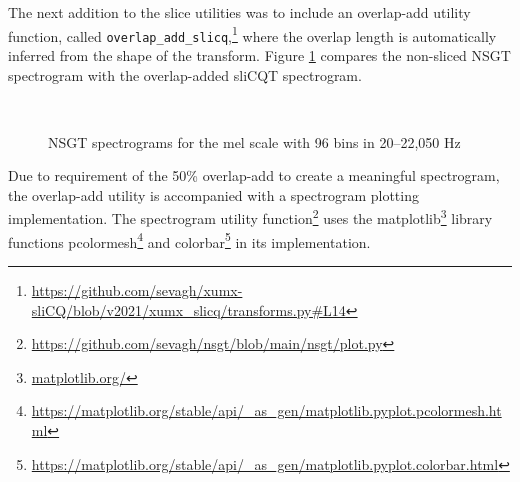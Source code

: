 \documentclass[report.tex]{subfiles}
\begin{document}
The next addition to the slice utilities was to include an overlap-add utility function, called \Verb#overlap_add_slicq#,\footnote{\url{https://github.com/sevagh/xumx-sliCQ/blob/v2021/xumx_slicq/transforms.py\#L14}} where the overlap length is automatically inferred from the shape of the transform. Figure \ref{fig:overlappedspectrograms} compares the non-sliced NSGT spectrogram with the overlap-added sliCQT spectrogram.

\begin{figure}[ht]
	\centering
	\\
	\caption{NSGT spectrograms for the mel scale with 96 bins in 20--22,050 Hz}
	\label{fig:overlappedspectrograms}
\end{figure}

Due to requirement of the 50\% overlap-add to create a meaningful spectrogram, the overlap-add utility is accompanied with a spectrogram plotting implementation.  The spectrogram utility function\footnote{\url{https://github.com/sevagh/nsgt/blob/main/nsgt/plot.py}} uses the matplotlib\footnote{\url{matplotlib.org/}} library functions pcolormesh\footnote{\url{https://matplotlib.org/stable/api/_as_gen/matplotlib.pyplot.pcolormesh.html}} and colorbar\footnote{\url{https://matplotlib.org/stable/api/_as_gen/matplotlib.pyplot.colorbar.html}} in its implementation.
\end{document}
